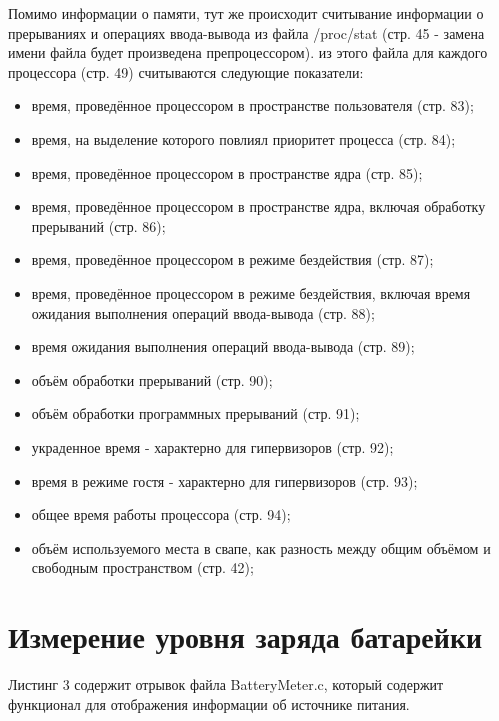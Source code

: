 \documentclass[a4paper, 12pt]{article}		%
\begin{document}
Помимо информации о памяти, тут же происходит считывание информации о прерываниях и операциях ввода-вывода из файла /proc/stat (стр. 45 - замена имени файла будет произведена препроцессором). из этого файла для каждого процессора (стр. 49) считываются следующие показатели:
\begin{itemize}
\item время, проведённое процессором в пространстве пользователя (стр. 83);
\item время, на выделение которого повлиял приоритет процесса (стр. 84);
\item время, проведённое процессором в пространстве ядра (стр. 85);
\item время, проведённое процессором в пространстве ядра, включая обработку прерываний (стр. 86);
\item время, проведённое процессором в режиме бездействия (стр. 87);
\item время, проведённое процессором в режиме бездействия, включая время ожидания выполнения операций ввода-вывода (стр. 88);
\item время ожидания выполнения операций ввода-вывода (стр. 89);
\item объём обработки прерываний (стр. 90);
\item объём обработки программных прерываний (стр. 91);
\item украденное время - характерно для гипервизоров (стр. 92);
\item время в режиме гостя - характерно для гипервизоров (стр. 93);
\item общее время работы процессора (стр. 94);

\item объём используемого места в свапе, как разность между общим объёмом и свободным пространством (стр. 42);
\end{itemize}



\newpage
\section{Измерение уровня заряда батарейки}

Листинг 3 содержит отрывок файла BatteryMeter.c, который содержит функционал для отображения информации об источнике питания.
\end{document}
